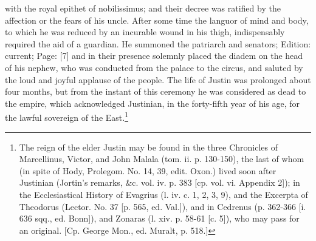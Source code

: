 with the royal epithet of nobilissimus; and their decree was ratified by the affection or the fears of his uncle. After some time the languor of mind and body, to which he was reduced by an incurable wound in his thigh, indispensably required the aid of a guardian. He summoned the patriarch and senators; Edition: current; Page: [7] and in their presence solemnly placed the diadem on the head of his nephew, who was conducted from the palace to the circus, and saluted by the loud and joyful applause of the people. The life of Justin was prolonged about four months, but from the instant of this ceremony he was considered as dead to the empire, which acknowledged Justinian, in the forty-fifth year of his age, for the lawful sovereign of the East.\footnote{The reign of the elder Justin may be found in the three Chronicles of Marcellinus, Victor, and John Malala (tom. ii. p. 130-150), the last of whom (in spite of Hody, Prolegom. No. 14, 39, edit. Oxon.) lived soon after Justinian (Jortin\texthebrew{}’s remarks, \&c. vol. iv. p. 383 [cp. vol. vi. Appendix 2]); in the Ecclesiastical History of Evagrius (l. iv. c. 1, 2, 3, 9), and the Excerpta of Theodorus (Lector. No. 37 [p. 565, ed. Val.]), and in Cedrenus (p. 362-366 [i. 636 sqq., ed. Bonn]), and Zonaras (l. xiv. p. 58-61 [c. 5]), who may pass for an original. [Cp. George Mon., ed. Muralt, p. 518.]}

